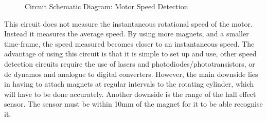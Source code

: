 \documentclass[a4]{report}
\begin{document}
	\begin{figure}[!h]
		\centering
		\caption{Circuit Schematic Diagram: Motor Speed Detection}
		\label{circhall}
	\end{figure} \newline  \noindent
	This circuit does not measure the instantaneous rotational speed of the motor. Instead it measures the average speed. By using more magnets, and a smaller time-frame, the speed measured becomes closer to an instantaneous speed. The advantage of using this circuit is that it is simple to set up and use, other speed detection circuits require the use of lasers and photodiodes/phototransistors, or dc dynamos and analogue to digital converters. However, the main downside lies in having to attach magnets at regular intervals to the rotating cylinder, which will have to be done accurately. Another downside is the range of the hall effect sensor. The sensor must be within 10mm of the magnet for it to be able recognise it. \newline \newline \noindent

\end{document}
